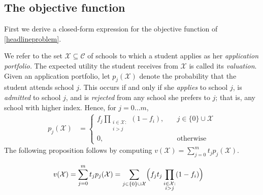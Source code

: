 \subsection{The objective function} \label{sectionObjective}

First we derive a closed-form expression for the objective function of \eqref{headlineproblem}.

We refer to the set $\mathcal{X} \subseteq \mathcal{C}$ of schools to which a student applies as her \emph{application portfolio.} The expected utility the student receives from $\mathcal{X}$ is called its \emph{valuation}. Given an application portfolio, let $p_j(\mathcal{X})$ denote the probability that the student attends school $j$. This occurs if and only if she \emph{applies} to school $j$, is \emph{admitted} to school $j$, and is \emph{rejected} from any school she prefers to $j$; that is, any school with higher index. Hence, for $j= 0\dots m$,
\begin{align}
p_j(\mathcal{X}) &= 
\begin{cases}
\displaystyle f_j  \prod_{\substack{i \in \mathcal{X}: \\ i > j}} (1 - f_{i}), \quad & j \in \{0\}\cup\mathcal{X}\\
0, \quad & \text{otherwise}
\end{cases} 
\end{align}
The following proposition follows by computing $v(\mathcal{X}) = \sum_{j=0}^m  t_j p_j(\mathcal{X})$.
\begin{proposition}
\begin{align}
v(\mathcal{X}) &= \sum_{j=0}^m t_j p_j(\mathcal{X}) = \sum_{j\in\{0\}\cup\mathcal{X}} \Bigl( f_j t_j \prod_{\substack{i \in \mathcal{X}: \\ i > j}} (1 - f_{i}) \Bigr)  \label{closedformportfoliovaluationX}%
\end{align}
\end{proposition}

